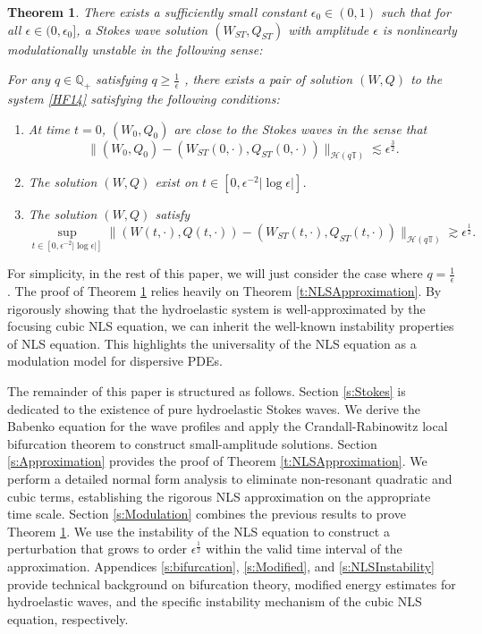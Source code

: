 \documentclass[12pt]{amsart}
\newtheorem{theorem}{Theorem}[section]
\theoremstyle{remark}
\theoremstyle{definition}
\numberwithin{equation}{section}
\newcommand{\e}{\epsilon}
\newcommand{\T}{\mathbb{T}}
\renewcommand{\H}{{\mathcal H }}
\newcommand{\f}{\frac}
\begin{document}
\begin{theorem} \label{t:modulational}
There exists a sufficiently small constant $\epsilon_0 \in (0,1)$ such that for all $\epsilon \in (0, \epsilon_0]$, a Stokes wave solution $(W_{ST}, Q_{ST})$ with amplitude $\epsilon$ is nonlinearly modulationally unstable in the following sense:

For any $q\in \mathbb{Q}_+$ satisfying $q \geq \frac{1}{\epsilon}$ , there exists a pair of solution $(W, Q)$ to the system \eqref{HF14} satisfying the following conditions:
\begin{enumerate}
\item At time $t=0$, $(W_0, Q_0)$ are close to the Stokes waves in the sense that
\begin{equation*}
    \|(W_0, Q_0) - (W_{ST}(0,\cdot), Q_{ST}(0, \cdot))\|_{\H(q\T)} \lesssim  \epsilon^{\frac{3}{2}}.
\end{equation*}
\item The solution $(W, Q)$ exist on $t\in [0, \epsilon^{-2}|\log \e|]$.
\item  The solution $(W, Q)$ satisfy
\begin{equation*}
    \sup_{t\in [0, \epsilon^{-2}|\log \e|]}  \|(W(t,\cdot), Q(t,\cdot)) - (W_{ST}(t, \cdot ), Q_{ST}(t,\cdot)) \|_{\H(q\T)} \gtrsim   \epsilon^{\frac{1}{2}}.
\end{equation*}
\end{enumerate}
\end{theorem}

For simplicity, in the rest of this paper, we will just consider the case where $q = \frac{1}{\epsilon}$.
The proof of Theorem \ref{t:modulational} relies heavily on Theorem \ref{t:NLSApproximation}.
By rigorously showing that the hydroelastic system is well-approximated by the focusing cubic NLS equation, we can inherit the well-known instability properties of NLS equation. 
This highlights the universality of the NLS equation as a modulation model for dispersive PDEs.


The remainder of this paper is structured as follows.
Section \ref{s:Stokes} is dedicated to the existence of pure hydroelastic Stokes waves. 
We derive the Babenko equation for the wave profiles and apply the Crandall-Rabinowitz local bifurcation theorem to construct small-amplitude solutions.
Section \ref{s:Approximation} provides the proof of Theorem \ref{t:NLSApproximation}. 
We perform a detailed normal form analysis to eliminate non-resonant quadratic and cubic terms, establishing the rigorous NLS approximation on the appropriate time scale.
Section \ref{s:Modulation} combines the previous results to prove Theorem \ref{t:modulational}. 
We use the instability of the NLS equation to construct a perturbation that grows to order $\e^\f12$ within the valid time interval of the approximation.
Appendices \ref{s:bifurcation}, \ref{s:Modified}, and \ref{s:NLSInstability} provide technical background on bifurcation theory, modified energy estimates for hydroelastic waves, and the specific instability mechanism of the cubic NLS equation, respectively.
\end{document}
